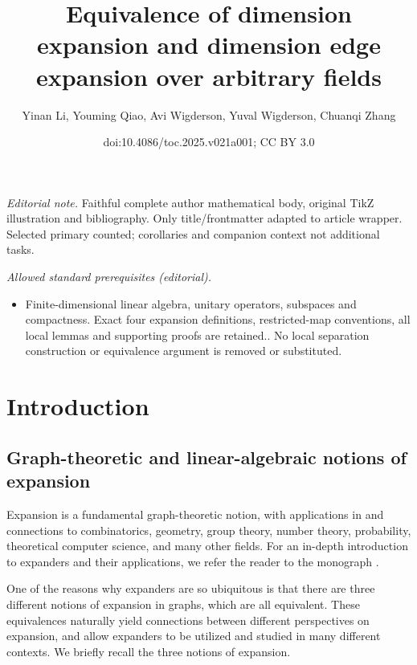\documentclass[11pt]{article}
\title{Equivalence of dimension expansion and dimension edge expansion over arbitrary fields}
\author{Yinan Li, Youming Qiao, Avi Wigderson, Yuval Wigderson, Chuanqi Zhang}
\date{doi:10.4086/toc.2025.v021a001; CC BY 3.0}
\theoremstyle{plain}
\numberwithin{equation}{section}
\theoremstyle{definition}
\begin{document}
\maketitle
\noindent\textit{Editorial note.} Faithful complete author mathematical body, original TikZ illustration and bibliography. Only title/frontmatter adapted to article wrapper. Selected primary counted; corollaries and companion context not additional tasks.\par\medskip
\noindent\textit{Allowed standard prerequisites (editorial).}\begin{itemize}
\item Finite-dimensional linear algebra, unitary operators, subspaces and compactness. Exact four expansion definitions, restricted-map conventions, all local lemmas and supporting proofs are retained.. No local separation construction or equivalence argument is removed or substituted.
\end{itemize}\medskip
\section{Introduction}
\subsection{Graph-theoretic and linear-algebraic notions of expansion}\label{subsec:overview}

Expansion is a fundamental graph-theoretic notion, with applications in and connections to combinatorics, geometry, group theory, number theory, probability, theoretical computer science, and many other fields. For an in-depth introduction to expanders and their applications, we refer the reader to the monograph \cite{HLW06}.

One of the reasons why expanders are so ubiquitous is that there are three different notions of expansion in graphs, which are all equivalent. These equivalences naturally yield connections between different perspectives on expansion, and allow expanders to be utilized and studied in many different contexts. We briefly recall the three notions of expansion.
\end{document}
